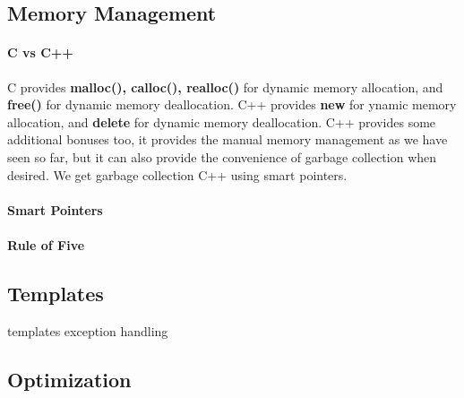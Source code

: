 \subsection{Memory Management}
\paragraph{C vs C++}
C provides \textbf{malloc(), calloc(), realloc()} for dynamic memory allocation, and \textbf{free()} for dynamic memory deallocation. C++ provides \textbf{new} for ynamic memory allocation, and \textbf{delete} for dynamic memory deallocation. C++ provides some additional bonuses too, it provides the manual memory management as we have seen so far, but it can also provide the convenience of garbage collection when desired. We get garbage collection C++ using smart pointers.
\paragraph{Smart Pointers} 
\paragraph{Rule of Five}

\subsection{Templates}
templates
exception handling
\subsection{Optimization}